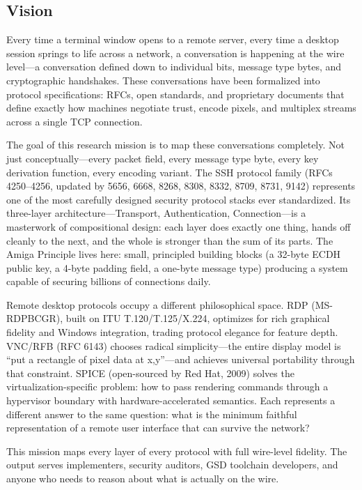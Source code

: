 \documentclass[11pt,letterpaper]{article}
\begin{document}
\subsection{Vision}

Every time a terminal window opens to a remote server, every time a desktop session springs to life across a network, a conversation is happening at the wire level---a conversation defined down to individual bits, message type bytes, and cryptographic handshakes. These conversations have been formalized into protocol specifications: RFCs, open standards, and proprietary documents that define exactly how machines negotiate trust, encode pixels, and multiplex streams across a single TCP connection.

The goal of this research mission is to map these conversations completely. Not just conceptually---every packet field, every message type byte, every key derivation function, every encoding variant. The SSH protocol family (RFCs 4250--4256, updated by 5656, 6668, 8268, 8308, 8332, 8709, 8731, 9142) represents one of the most carefully designed security protocol stacks ever standardized. Its three-layer architecture---Transport, Authentication, Connection---is a masterwork of compositional design: each layer does exactly one thing, hands off cleanly to the next, and the whole is stronger than the sum of its parts. The Amiga Principle lives here: small, principled building blocks (a 32-byte ECDH public key, a 4-byte padding field, a one-byte message type) producing a system capable of securing billions of connections daily.

Remote desktop protocols occupy a different philosophical space. RDP (MS-RDPBCGR), built on ITU T.120/T.125/X.224, optimizes for rich graphical fidelity and Windows integration, trading protocol elegance for feature depth. VNC/RFB (RFC 6143) chooses radical simplicity---the entire display model is ``put a rectangle of pixel data at x,y''---and achieves universal portability through that constraint. SPICE (open-sourced by Red Hat, 2009) solves the virtualization-specific problem: how to pass rendering commands through a hypervisor boundary with hardware-accelerated semantics. Each represents a different answer to the same question: what is the minimum faithful representation of a remote user interface that can survive the network?

This mission maps every layer of every protocol with full wire-level fidelity. The output serves implementers, security auditors, GSD toolchain developers, and anyone who needs to reason about what is actually on the wire.
\end{document}
